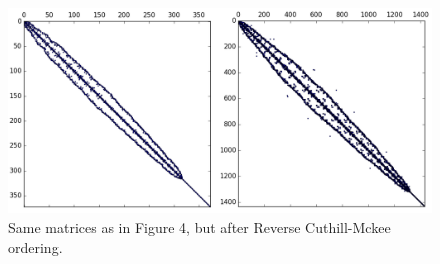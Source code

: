 \documentclass[letterpaper,10pt]{article}
\begin{document}
\begin{figure}[!htb]
\centering
\includegraphics[width=1\textwidth]{spyLQ2.PNG}
\caption{Same matrices as in Figure 4, but after Reverse Cuthill-Mckee ordering.}
\end{figure}
\end{document}
